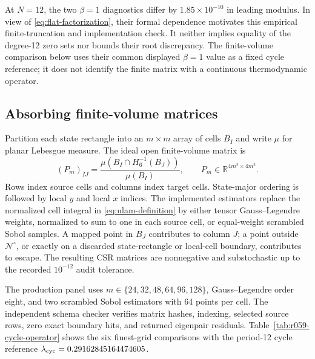 At $N=12$, the two $\beta=1$ diagnostics differ by
$1.85\times10^{-10}$ in leading modulus.  In view of
\eqref{eq:flat-factorization}, their formal dependence motivates this empirical
finite-truncation and implementation check.  It neither implies equality of
the degree-12 zero sets nor bounds their root discrepancy.  The finite-volume
comparison below uses their common displayed $\beta=1$ value as a fixed cycle
reference; it does not identify the finite matrix with a continuous
thermodynamic operator.

\subsection{Absorbing finite-volume matrices}

Partition each state rectangle into an $m\times m$ array of cells $B_I$ and
write $\mu$ for planar Lebesgue measure.  The ideal open finite-volume matrix is
\begin{equation}
 (P_m)_{IJ}
 =\frac{\mu\!\left(B_I\cap H_6^{-1}(B_J)\right)}{\mu(B_I)},
 \qquad P_m\in\mathbb R^{4m^2\times4m^2}.
 \label{eq:ulam-definition}
\end{equation}
Rows index source cells and columns index target cells.  State-major ordering
is followed by local $y$ and local $x$ indices.  The implemented estimators
replace the normalized cell integral in \eqref{eq:ulam-definition} by either
tensor Gauss--Legendre weights, normalized to sum to one in each source cell,
or equal-weight scrambled Sobol samples.  A mapped point in $B_J$ contributes
to column $J$; a point outside $\mathcal N^\circ$, or exactly on a discarded
state-rectangle or local-cell boundary, contributes to escape.  The resulting
CSR matrices are nonnegative and substochastic up to the recorded
$10^{-12}$ audit tolerance.

The production panel uses
$m\in\{24,32,48,64,96,128\}$, Gauss--Legendre order eight, and two scrambled
Sobol estimators with 64 points per cell.  The independent schema checker
verifies matrix hashes, indexing, selected source rows, zero exact boundary
hits, and returned eigenpair residuals.  Table~\ref{tab:r059-cycle-operator}
shows the six finest-grid comparisons with the period-12 cycle reference
$\lambda_{\rm cyc}=0.29162845164474605$.

